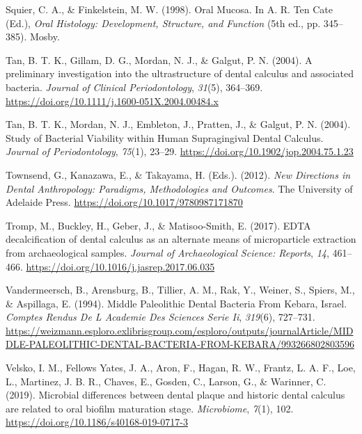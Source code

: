 \documentclass[
  letterpaper,
]{book}
\newlength{\cslhangindent}
\newlength{\cslentryspacingunit} %
\newenvironment{CSLReferences}[2] %
 {%
  \setlength{\parindent}{0pt}
  \ifodd #1
  \let\oldpar\par
  \def\par{\hangindent=\cslhangindent\oldpar}
  \fi
  \setlength{\parskip}{#2\cslentryspacingunit}
 }%
 {}
\begin{document}
\begin{CSLReferences}{1}{0}
\leavevmode{}%
Squier, C. A., \& Finkelstein, M. W. (1998). Oral {Mucosa}. In A. R. Ten
Cate (Ed.), \emph{Oral {Histology}: {Development}, {Structure}, and
{Function}} (5th ed., pp. 345--385). {Mosby}.

\leavevmode{}%
Tan, B. T. K., Gillam, D. G., Mordan, N. J., \& Galgut, P. N. (2004). A
preliminary investigation into the ultrastructure of dental calculus and
associated bacteria. \emph{Journal of Clinical Periodontology},
\emph{31}(5), 364--369.
\url{https://doi.org/10.1111/j.1600-051X.2004.00484.x}

\leavevmode{}%
Tan, B. T. K., Mordan, N. J., Embleton, J., Pratten, J., \& Galgut, P.
N. (2004). Study of {Bacterial Viability} within {Human Supragingival
Dental Calculus}. \emph{Journal of Periodontology}, \emph{75}(1),
23--29. \url{https://doi.org/10.1902/jop.2004.75.1.23}

\leavevmode{}%
Townsend, G., Kanazawa, E., \& Takayama, H. (Eds.). (2012). \emph{New
{Directions} in {Dental Anthropology}: {Paradigms}, {Methodologies} and
{Outcomes}}. {The University of Adelaide Press}.
\url{https://doi.org/10.1017/9780987171870}

\leavevmode{}%
Tromp, M., Buckley, H., Geber, J., \& Matisoo-Smith, E. (2017). {EDTA}
decalcification of dental calculus as an alternate means of
microparticle extraction from archaeological samples. \emph{Journal of
Archaeological Science: Reports}, \emph{14}, 461--466.
\url{https://doi.org/10.1016/j.jasrep.2017.06.035}

\leavevmode{}%
Vandermeersch, B., Arensburg, B., Tillier, A. M., Rak, Y., Weiner, S.,
Spiers, M., \& Aspillaga, E. (1994). Middle {Paleolithic Dental Bacteria
From Kebara}, {Israel}. \emph{Comptes Rendus De L Academie Des Sciences
Serie Ii}, \emph{319}(6), 727--731.
\url{https://weizmann.esploro.exlibrisgroup.com/esploro/outputs/journalArticle/MIDDLE-PALEOLITHIC-DENTAL-BACTERIA-FROM-KEBARA/993266802803596}

\leavevmode{}%
Velsko, I. M., Fellows Yates, J. A., Aron, F., Hagan, R. W., Frantz, L.
A. F., Loe, L., Martinez, J. B. R., Chaves, E., Gosden, C., Larson, G.,
\& Warinner, C. (2019). Microbial differences between dental plaque and
historic dental calculus are related to oral biofilm maturation stage.
\emph{Microbiome}, \emph{7}(1), 102.
\url{https://doi.org/10.1186/s40168-019-0717-3}


\end{CSLReferences}
\end{document}
